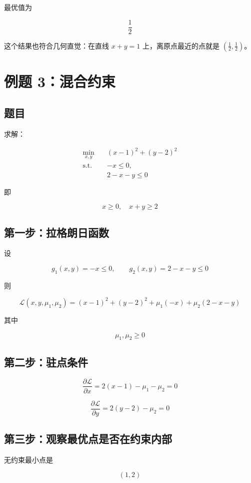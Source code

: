 最优值为

\[
\frac12
\]

这个结果也符合几何直觉：在直线 \(x+y=1\) 上，离原点最近的点就是 \(\left(\frac12,\frac12\right)\)。

\section{例题 3：混合约束}

\subsection{题目}

求解：

\[
\begin{aligned}
\min_{x,y}\quad & (x-1)^2+(y-2)^2\\
\text{s.t.}\quad & -x\le 0,\\
& 2-x-y\le 0
\end{aligned}
\]

即

\[
x\ge 0,\quad x+y\ge 2
\]

\subsection{第一步：拉格朗日函数}

设

\[
g_1(x,y)=-x\le 0,\qquad g_2(x,y)=2-x-y\le 0
\]

则

\[
\mathcal{L}(x,y,\mu_1,\mu_2)
=
(x-1)^2+(y-2)^2+\mu_1(-x)+\mu_2(2-x-y)
\]

其中

\[
\mu_1,\mu_2\ge 0
\]

\subsection{第二步：驻点条件}

\[
\frac{\partial \mathcal{L}}{\partial x}=2(x-1)-\mu_1-\mu_2=0
\]

\[
\frac{\partial \mathcal{L}}{\partial y}=2(y-2)-\mu_2=0
\]

\subsection{第三步：观察最优点是否在约束内部}

无约束最小点是

\[
(1,2)
\]


